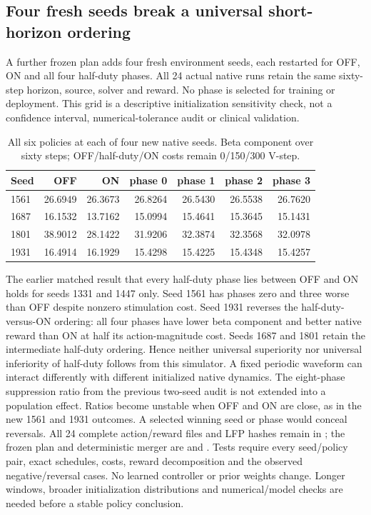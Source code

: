 \subsection{Four fresh seeds break a universal short-horizon ordering}
A further frozen plan adds four fresh environment seeds, each restarted for OFF, ON and all four half-duty phases. All 24 actual native runs retain the same sixty-step horizon, source, solver and reward. No phase is selected for training or deployment. This grid is a descriptive initialization sensitivity check, not a confidence interval, numerical-tolerance audit or clinical validation.
\begin{table}[ht]\centering
\caption{All six policies at each of four new native seeds. Beta component over sixty steps; OFF/half-duty/ON costs remain 0/150/300 V-step.}
\begin{tabular}{lrrrrrr}\hline
Seed&OFF&ON&phase 0&phase 1&phase 2&phase 3\\\hline
1561&26.6949&26.3673&26.8264&26.5430&26.5538&26.7620\\
1687&16.1532&13.7162&15.0994&15.4641&15.3645&15.1431\\
1801&38.9012&28.1422&31.9206&32.3874&32.3568&32.0978\\
1931&16.4914&16.1929&15.4298&15.4225&15.4348&15.4257\\\hline
\end{tabular}\end{table}
The earlier matched result that every half-duty phase lies between OFF and ON holds for seeds 1331 and 1447 only. Seed 1561 has phases zero and three worse than OFF despite nonzero stimulation cost. Seed 1931 reverses the half-duty-versus-ON ordering: all four phases have lower beta component and better native reward than ON at half its action-magnitude cost. Seeds 1687 and 1801 retain the intermediate half-duty ordering. Hence neither universal superiority nor universal inferiority of half-duty follows from this simulator. A fixed periodic waveform can interact differently with different initialized native dynamics.
The eight-phase suppression ratio from the previous two-seed audit is not extended into a population effect. Ratios become unstable when OFF and ON are close, as in the new 1561 and 1931 outcomes. A selected winning seed or phase would conceal reversals. All 24 complete action/reward files and LFP hashes remain in ; the frozen plan and deterministic merger are  and . Tests require every seed/policy pair, exact schedules, costs, reward decomposition and the observed negative/reversal cases. No learned controller or prior weights change. Longer windows, broader initialization distributions and numerical/model checks are needed before a stable policy conclusion.


